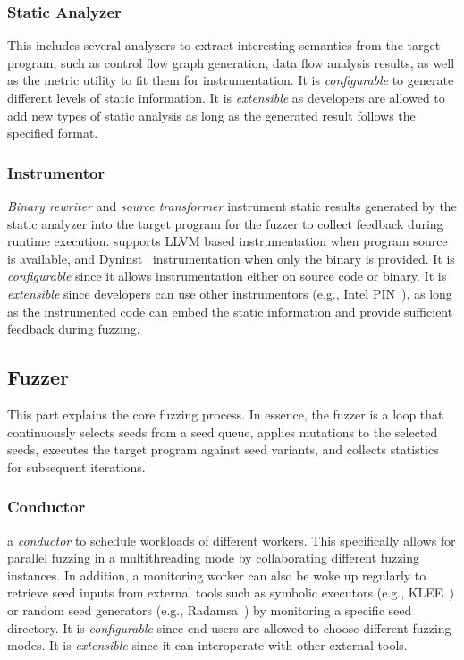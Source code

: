 \subsubsection{Static Analyzer}\label{sec:static_analysis}
This includes several analyzers to extract interesting semantics from the target program, such as control flow graph generation, data flow analysis results, as well as the metric utility to fit them for instrumentation.
It is \textit{configurable} to generate different levels of static information. It is \textit{extensible} as developers are allowed to add new types of static analysis as long as the generated result follows the specified format.


\subsubsection{Instrumentor}
\emph{Binary rewriter} and \emph{source transformer} instrument static results generated by the static analyzer into the target program for the fuzzer to collect feedback during runtime execution.
{\FOT} supports LLVM based instrumentation when program source is available, and Dyninst~\cite{dyninst} instrumentation when only the binary is provided.
It is \textit{configurable} since it allows instrumentation either on source code or binary.
It is \textit{extensible} since developers can use other instrumentors (e.g., Intel PIN~\cite{pin}), as long as the instrumented code can embed the static information and provide sufficient feedback during fuzzing.

\subsection{Fuzzer}
This part explains the core fuzzing process. 
In essence, the fuzzer is a loop that continuously selects seeds from a seed queue, applies mutations to the selected seeds, executes the target program against seed variants, and collects statistics for subsequent iterations.

\subsubsection{Conductor}
{\FOT} a \emph{conductor} to schedule workloads of different workers. This specifically allows for parallel fuzzing in a multithreading mode by collaborating different fuzzing instances. In addition, a monitoring worker can also be woke up regularly to retrieve seed inputs from external tools such as symbolic executors (e.g., KLEE~\cite{klee}) or random seed generators (e.g., Radamsa~\cite{radamsa}) by monitoring a specific seed directory.
It is \textit{configurable} since end-users are allowed to choose different fuzzing modes.
It is \textit{extensible} since it can interoperate with other external tools.


